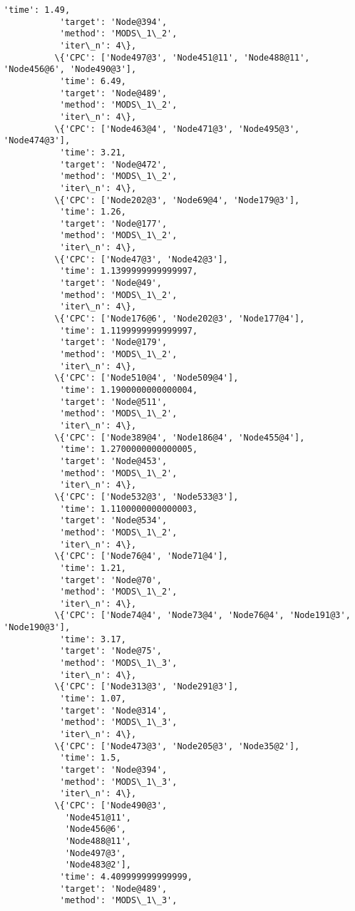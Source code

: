 \documentclass[11pt]{article}
\begin{document}
\begin{Verbatim}[commandchars=\\\{\}]
           'time': 1.49,
           'target': 'Node@394',
           'method': 'MODS\_1\_2',
           'iter\_n': 4\},
          \{'CPC': ['Node497@3', 'Node451@11', 'Node488@11', 'Node456@6', 'Node490@3'],
           'time': 6.49,
           'target': 'Node@489',
           'method': 'MODS\_1\_2',
           'iter\_n': 4\},
          \{'CPC': ['Node463@4', 'Node471@3', 'Node495@3', 'Node474@3'],
           'time': 3.21,
           'target': 'Node@472',
           'method': 'MODS\_1\_2',
           'iter\_n': 4\},
          \{'CPC': ['Node202@3', 'Node69@4', 'Node179@3'],
           'time': 1.26,
           'target': 'Node@177',
           'method': 'MODS\_1\_2',
           'iter\_n': 4\},
          \{'CPC': ['Node47@3', 'Node42@3'],
           'time': 1.1399999999999997,
           'target': 'Node@49',
           'method': 'MODS\_1\_2',
           'iter\_n': 4\},
          \{'CPC': ['Node176@6', 'Node202@3', 'Node177@4'],
           'time': 1.1199999999999997,
           'target': 'Node@179',
           'method': 'MODS\_1\_2',
           'iter\_n': 4\},
          \{'CPC': ['Node510@4', 'Node509@4'],
           'time': 1.1900000000000004,
           'target': 'Node@511',
           'method': 'MODS\_1\_2',
           'iter\_n': 4\},
          \{'CPC': ['Node389@4', 'Node186@4', 'Node455@4'],
           'time': 1.2700000000000005,
           'target': 'Node@453',
           'method': 'MODS\_1\_2',
           'iter\_n': 4\},
          \{'CPC': ['Node532@3', 'Node533@3'],
           'time': 1.1100000000000003,
           'target': 'Node@534',
           'method': 'MODS\_1\_2',
           'iter\_n': 4\},
          \{'CPC': ['Node76@4', 'Node71@4'],
           'time': 1.21,
           'target': 'Node@70',
           'method': 'MODS\_1\_2',
           'iter\_n': 4\},
          \{'CPC': ['Node74@4', 'Node73@4', 'Node76@4', 'Node191@3', 'Node190@3'],
           'time': 3.17,
           'target': 'Node@75',
           'method': 'MODS\_1\_3',
           'iter\_n': 4\},
          \{'CPC': ['Node313@3', 'Node291@3'],
           'time': 1.07,
           'target': 'Node@314',
           'method': 'MODS\_1\_3',
           'iter\_n': 4\},
          \{'CPC': ['Node473@3', 'Node205@3', 'Node35@2'],
           'time': 1.5,
           'target': 'Node@394',
           'method': 'MODS\_1\_3',
           'iter\_n': 4\},
          \{'CPC': ['Node490@3',
            'Node451@11',
            'Node456@6',
            'Node488@11',
            'Node497@3',
            'Node483@2'],
           'time': 4.409999999999999,
           'target': 'Node@489',
           'method': 'MODS\_1\_3',

\end{Verbatim}
\end{document}
